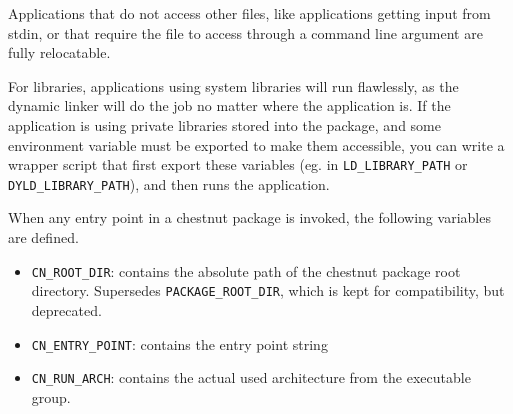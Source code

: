 Applications that do not access other files, like applications getting input
from stdin, or that require the file to access through a command line argument
are fully relocatable.

For libraries, applications using system libraries will run flawlessly, as the
dynamic linker will do the job no matter where the application is. If the
application is using private libraries stored into the package, and some
environment variable must be exported to make them accessible, you can write a
wrapper script that first export these variables (eg. in \verb+LD_LIBRARY_PATH+
or \verb+DYLD_LIBRARY_PATH+), and then runs the application.

When any entry point in a chestnut package is invoked, the following variables are defined.
\begin{itemize}
\item \verb+CN_ROOT_DIR+: contains the absolute path of the chestnut package root directory. Supersedes \verb+PACKAGE_ROOT_DIR+, which is kept for compatibility, but deprecated.
\item \verb+CN_ENTRY_POINT+: contains the entry point string
\item \verb+CN_RUN_ARCH+: contains the actual used architecture from the executable group.
\end{itemize}



